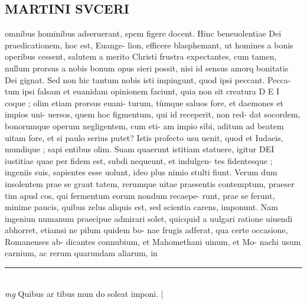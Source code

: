 \documentclass{article}
\begin{document}
\begin{pages}
\section*{MARTINI SVCERI }\pstart omnibus hominibus adseruerant, spem figere docent.  Hinc beneuolentiae Dei praedicationem, hoc est, Euange- lion, efficere blasphemant, ut homines a bonis operibus cessent, salutem a merito Christi frustra expectantes, cum tamen, nullum prorsus a nobis bonum opus sieri possit, nisi id sensus amorq bonitatis Dei gignat.  Sed non hic tantum nobis isti impingunt, quod ipsi peccant.  Pecca- tum ipsi falsam et euanidam opinionem faciunt, quia non sit creatura D E I coque ; olim etiam prorsus euani- turum, tùmque saluos fore, et daemones et impios uni- uersos, quem hoc figmentum, qui id receperit, non red- dat socordem, bonorumque operum negligentem, cum eti- am impio sibi, aditum ad beatem uitam fore, et si paulo serius putet?  \pend\pstart Istis profecto usu uenit, quod et Iudaeis, mundique ; sapi entibus olim. Suam quaerunt istitiam statuere, igitur DEI iustitiae quae per fidem est, subdi nequeunt, et indulgen- tes fidentesque ; ingeniis suis, sapientes esse uolunt, ideo plus nimio stulti fiunt.  Verum dum insolentem prae se graut tatem, rerumque uitae praesentis contemptum, praeser tim apud cos, qui fermentum eorum nondum recaepe- runt, prae se ferunt, minime paucis, quibus zelus aliquis est, sed scientia carens, imponunt.  Nam ingeniun numanum praecipue admirari solet, quicquid a uulgari ratione uiuendi abhorret, etiamsi ne pilum quidem bo- nae frugis adferat, qua certe occasione, Romanenses ab- dicantes connubium, et Mahomethani uinum, et Mo- nachi usum carnium, ac rerum quarundam aliarum, in  \pend
\vspace{0.5cm}\noindent
\vspace{0.2cm}\rule{1cm}{0.2pt}\\ 
\hspace{0.2cm}\textit{mg}
\footnotesize Quibus   ar tibus mun do soleat imponi.  
\normalsize| 

\end{pages}
\end{document}
